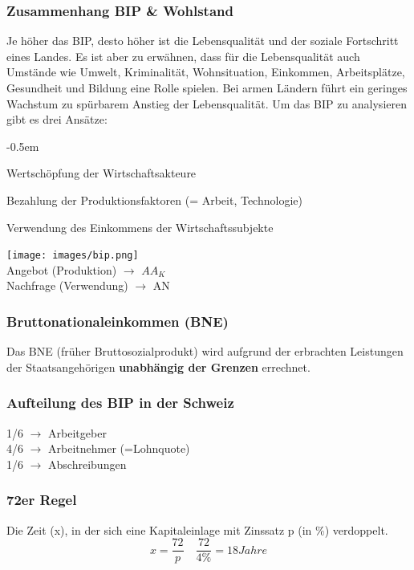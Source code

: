 \begin{multicols}{2}
\subsubsection{Zusammenhang BIP \& Wohlstand}
Je höher das BIP, desto höher ist die Lebensqualität und der soziale Fortschritt eines Landes. Es ist aber zu erwähnen, dass für die Lebensqualität auch Umstände wie Umwelt, Kriminalität, Wohnsituation, Einkommen, Arbeitsplätze, Gesundheit und Bildung eine Rolle spielen. Bei armen Ländern führt ein geringes Wachstum zu spürbarem Anstieg der Lebensqualität. Um das BIP zu analysieren gibt es drei Ansätze:
\begin{description}
	\itemsep-0.5em
	\item [Produktionsansatz:] Wertschöpfung der Wirtschaftsakteure
	\item [Einkommensansatz:] Bezahlung der Produktionsfaktoren (= Arbeit, Technologie)
	\item [Verwendungsansatz:] Verwendung des Einkommens der Wirtschaftssubjekte
\end{description}
\vfill\null
\columnbreak
\texttt{[image: images/bip.png]}\\
Angebot (Produktion) $\rightarrow$ $AA_K$\\
Nachfrage (Verwendung) $\rightarrow$ AN
\end{multicols}


\begin{multicols}{2}
	\subsubsection{Bruttonationaleinkommen (BNE)}
	Das BNE (früher Bruttosozialprodukt) wird aufgrund der erbrachten Leistungen der Staatsangehörigen \textbf{unabhängig der Grenzen} errechnet.
	\columnbreak
	\subsubsection{Aufteilung des BIP in der Schweiz}
	1/6 $\rightarrow$ Arbeitgeber\\
	4/6 $\rightarrow$ Arbeitnehmer (=Lohnquote)\\
	1/6 $\rightarrow$ Abschreibungen
\end{multicols}

\subsubsection{72er Regel}
Die Zeit (x), in der sich eine Kapitaleinlage mit Zinssatz p (in \%) verdoppelt.
\begin{equation*}
	x=\frac{72}{p} \quad \frac{72}{4\%}= 18 Jahre
\end{equation*}

\clearpage
\pagebreak